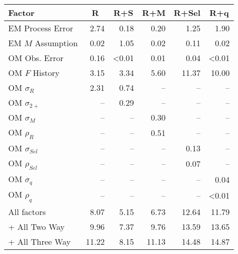 \begin{center}
\begin{tabular}{lrrrrr}
\hline\hline
\multicolumn{1}{l}{Factor}&\multicolumn{1}{c}{R}&\multicolumn{1}{c}{R+S}&\multicolumn{1}{c}{R+M}&\multicolumn{1}{c}{R+Sel}&\multicolumn{1}{c}{R+q}\tabularnewline
\hline
EM Process Error& 2.74& 0.18& 0.20& 1.25& 1.90\tabularnewline
EM $M$ Assumption& 0.02& 1.05& 0.02& 0.11& 0.02\tabularnewline
OM Obs. Error& 0.16&\textless  0.01& 0.01& 0.04&\textless  0.01\tabularnewline
OM $F$ History& 3.15& 3.34& 5.60&11.37&10.00\tabularnewline
OM $\sigma_R$& 2.31& 0.74&--&--&--\tabularnewline
OM $\sigma_{2+}$ &--& 0.29&--&--&--\tabularnewline
OM $\sigma_M$&--&--& 0.30&--&--\tabularnewline
OM $\rho_R$&--&--& 0.51&--&--\tabularnewline
OM $\sigma_{Sel}$&--&--&--& 0.13&--\tabularnewline
OM $\rho_{Sel}$&--&--&--& 0.07&--\tabularnewline
OM $\sigma_q$&--&--&--&--& 0.04\tabularnewline
OM $\rho_q$&--&--&--&--&\textless  0.01\tabularnewline
All factors& 8.07& 5.15& 6.73&12.64&11.79\tabularnewline
+ All Two Way& 9.96& 7.37& 9.76&13.59&13.65\tabularnewline
+ All Three Way&11.22& 8.15&11.13&14.48&14.87\tabularnewline
\hline
\end{tabular}\end{center}
